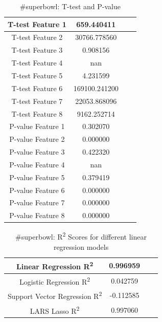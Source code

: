 \documentclass[12pt]{article}
\begin{document}
\begin{table}[H]
	\centering
	\begin{tabular}{| c | c | c | c |}
		\hline 
		T-test Feature 1 & 659.440411 \\\hline
		T-test Feature 2 & 30766.778560 \\\hline
		T-test Feature 3 & 0.908156 \\\hline 
		T-test Feature 4 & nan \\\hline
		T-test Feature 5 & 4.231599 \\\hline
		T-test Feature 6 & 169100.241200 \\\hline
		T-test Feature 7 & 22053.868096 \\\hline
		T-test Feature 8 & 9162.252714 \\\hline
		P-value Feature 1 & 0.302070 \\\hline
		P-value Feature 2 & 0.000000 \\\hline
		P-value Feature 3 & 0.422320 \\\hline
		P-value Feature 4 & nan \\\hline
		P-value Feature 5 & 0.379419 \\\hline
		P-value Feature 6 & 0.000000 \\\hline
		P-value Feature 7 & 0.000000 \\\hline
		P-value Feature 8 & 0.000000 \\\hline
	\end{tabular} 
	\caption{\#superbowl: T-test and P-value}
	\label{part1:tab1}
\end{table} 


\begin{table}[H]
	\centering
	\begin{tabular}{| c | c | c | c |}
		\hline 
		Linear Regression R\textsuperscript2  & 0.996959 \\\hline
		Logistic Regression R\textsuperscript2  & 0.042759 \\\hline
		Support Vector Regression R\textsuperscript2  & -0.112585 \\\hline
		LARS Lasso R\textsuperscript2  & 0.997060 \\\hline
	\end{tabular} 
	\caption{\#superbowl: R\textsuperscript2 Scores for different linear regression models}
	\label{part1:tab1}
\end{table} 
\end{document}
